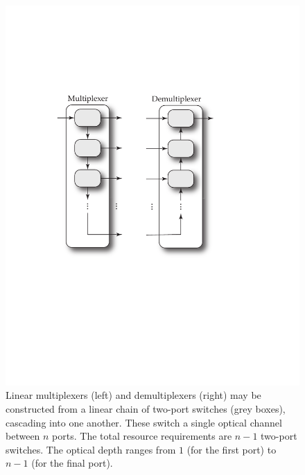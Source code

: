 \documentclass[aps, rmp, twocolumn, amsmath, amssymb, nofootinbib, superscriptaddress, longbibliography, floatfix, table-of-contents, eqsecnum]{revtex4-1}
\begin{document}
\begin{figure}[!htb]
\includegraphics[width=0.85\columnwidth]{linear_multiplexer}
\caption{Linear multiplexers (left) and demultiplexers (right) may be constructed from a linear chain of two-port switches (grey boxes), cascading into one another. These switch a single optical channel between $n$ ports. The total resource requirements are \mbox{$n-1$} two-port switches. The optical depth ranges from $1$ (for the first port) to \mbox{$n-1$} (for the final port).} \label{fig:linear_multiplexer} 
\end{figure}
\end{document}
